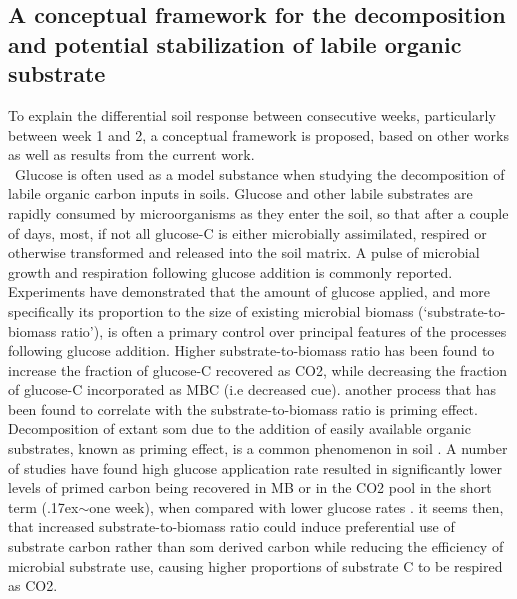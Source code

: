 	\subsection{A conceptual framework for the decomposition and potential stabilization of labile organic substrate} \label{stabilizaton_model}
	To explain the differential soil response between consecutive weeks, particularly between week 1 and 2, a conceptual framework is proposed, based on other works as well as results from the current work.\\ \
		Glucose is often used as a model substance when studying the decomposition of labile organic carbon inputs in soils\citep{kuzyakov2010}. Glucose and other labile substrates are rapidly consumed by microorganisms as they enter the soil, so that after a couple of days, most, if not all glucose-C is either microbially assimilated, respired or otherwise transformed and released into the soil matrix\citep{fischer2010}. A pulse of microbial growth and respiration following glucose addition is commonly reported.
	Experiments have demonstrated that the amount of glucose applied, and more specifically its proportion to the size of existing microbial biomass (‘substrate-to-biomass ratio’), is often a primary control over principal features of the processes following  glucose addition. Higher substrate-to-biomass ratio has been found to increase the fraction of glucose-C recovered as CO2, while decreasing the fraction of glucose-C incorporated as MBC (i.e decreased \gls{cue})\citep{schneckenberger2008, tian2015}.
	another process that has been found to correlate with the substrate-to-biomass ratio is priming effect. Decomposition of extant \gls{som} due to the addition of easily available organic substrates, known as priming effect, is a common phenomenon in soil \citep{kuzyakov2010}. A number of studies have found  high glucose application rate resulted in significantly lower levels of primed carbon being recovered in MB or in the  CO2 pool in the short term ({\raise.17ex\hbox{$\scriptstyle\mathtt{\sim}$}}one week), when compared with lower glucose rates \citep{blagodatskaya2011, schneckenberger2008, wu1993}.
	it seems then, that increased substrate-to-biomass ratio could induce preferential use of substrate carbon rather than \gls{som} derived carbon while reducing the efficiency of microbial substrate use, causing higher proportions of substrate C to be respired as CO2.
